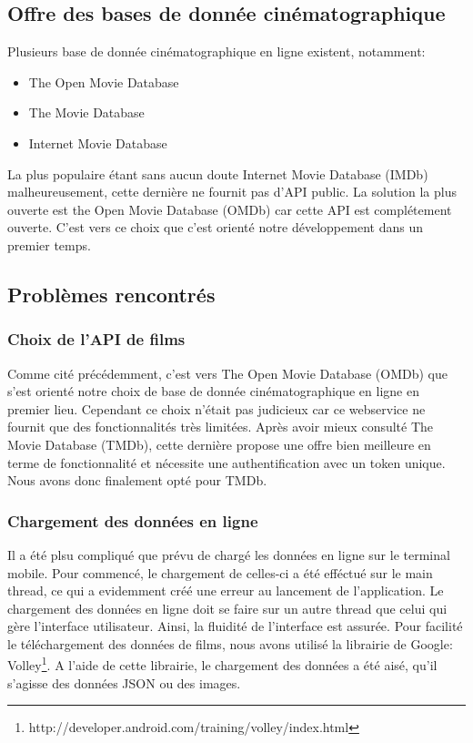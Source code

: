 \subsection*{Offre des bases de donnée cinématographique}
Plusieurs base de donnée cinématographique en ligne existent, notamment:

\begin{itemize}
	\item The Open Movie Database
 	\item The Movie Database
 	\item Internet Movie Database
\end{itemize}

La plus populaire étant sans aucun doute Internet Movie Database (IMDb) malheureusement, cette dernière ne fournit pas d'API public. La solution la plus ouverte est the Open Movie Database (OMDb) car cette API est complétement ouverte. C'est vers ce choix que c'est orienté notre développement dans un premier temps.

\subsection*{Problèmes rencontrés}

\subsubsection*{Choix de l'API de films}
Comme cité précédemment, c'est vers The Open Movie Database (OMDb) que s'est orienté notre choix de base de donnée cinématographique en ligne en premier lieu. Cependant ce choix n'était pas judicieux car ce webservice ne fournit que des fonctionnalités très limitées. Après avoir mieux consulté The Movie Database (TMDb), cette dernière propose une offre bien meilleure en terme de fonctionnalité et nécessite une authentification avec un token unique. Nous avons donc finalement opté pour TMDb.

\subsubsection*{Chargement des données en ligne}
Il a été plsu compliqué que prévu de chargé les données en ligne sur le terminal mobile. Pour commencé, le chargement de celles-ci a été efféctué sur le main thread, ce qui a evidemment créé une erreur au lancement de l'application. Le chargement des données en ligne doit se faire sur un autre thread que celui qui gère l'interface utilisateur. Ainsi, la fluidité de l'interface est assurée. Pour facilité le téléchargement des données de films, nous avons utilisé la librairie de Google: Volley\footnote{http://developer.android.com/training/volley/index.html}. A l'aide de cette librairie, le chargement des données a été aisé, qu'il s'agisse des données JSON ou des images.






